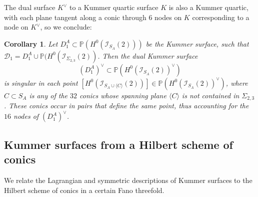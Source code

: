 \documentclass[a4paper,11pt]{amsart}
\newtheorem{cor}[thm]{Corollary}
\theoremstyle{definition}
\numberwithin{equation}{section}
\numberwithin{equation}{section} \theoremstyle{definition}
\begin{document}
The dual surface $K^{\vee}$ to a Kummer quartic surface $K$ is also a Kummer quartic, with each plane tangent along a conic through $6$ nodes on $K$ corresponding to a node on $K^{\vee}$, so we conclude:
\begin{cor}  Let $D_1^A\subset {{\mathbb{P}}}(H^0(\mathcal{I}_{S_A}(2)))$ be the Kummer surface, such that ${\mathcal D}_1= D_1^A\cup {{\mathbb{P}}}(H^0({\mathcal I}_{\Sigma_{2,3}}(2))$.  Then the dual Kummer surface 
\[
(D_1^A)^{\vee}\subset {{\mathbb{P}}}(H^0({\mathcal I}_{S_A}(2))^\vee)
\]
is singular in each point $[H^0({\mathcal I}_{S_A\cup \langle C\rangle}(2))]\in  {{\mathbb{P}}}(H^0({\mathcal I}_{S_A}(2))^\vee)$, where $C\subset S_A$ is any of the $32$ conics whose spanning plane $\langle C\rangle$ is not contained in $\Sigma_{2,3}$. These conics occur in pairs that define the same point, thus accounting for the $16$ nodes of $(D_1^A)^{\vee}$.
 \end{cor}

\subsection{Kummer surfaces from a Hilbert scheme of conics}\label{hilbert-kummer}
We relate the Lagrangian and symmetric descriptions of Kummer surfaces to the Hilbert scheme of conics in a certain Fano threefold. 
 
\end{document}
